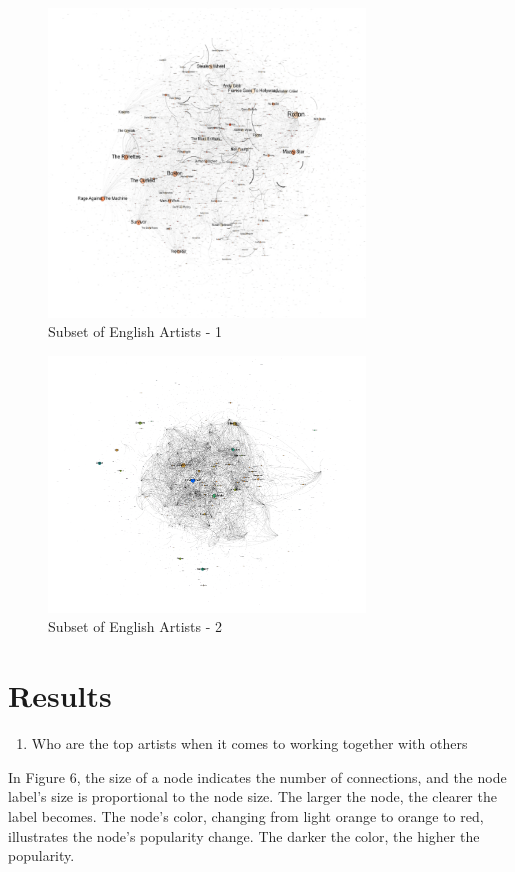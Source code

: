 \documentclass[12pt,a4paper]{article}
\begin{document}
\begin{figure}[H]
  \centering
  \includegraphics[width=0.75\textwidth]{subset2}
  \caption{Subset of English Artists - 1}
\end{figure}

\begin{figure}[H]
  \centering
  \includegraphics[width=0.75\textwidth]{subset}
  \caption{Subset of English Artists - 2}
\end{figure}
\section{Results}
\begin{enumerate}
  \item Who are the top artists when it comes to working together with others
\end{enumerate}
In Figure 6, the size of a node indicates the number of connections, and the node label's size is proportional to the node size. The larger the node, the clearer the label becomes. The node's color, changing from light orange to orange to red, illustrates the node's popularity change. The darker the color, the higher the popularity.\\
\end{document}
